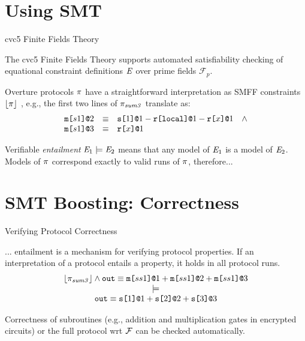 \documentclass{beamer}
\newcommand{\sumthree}{\prog_{\mathit{sum3}}}
\begin{document}
\section{Using SMT}

\begin{frame}{cvc5 Finite Fields Theory}

  The cvc5 Finite Fields Theory supports automated satisfiability checking of equational
  constraint definitions $\mathit{E}$ over prime fields $\mathcal{F}_{p}$.

  \medskip
  
  Overture protocols $\pi$ have a straightforward interpretation as SMFF constraints $\lfloor \pi \rfloor$ , e.g.,
  the first two lines of $\pi_{\mathit{sum3}}$ translate as:
  $$
    \begin{array}{lll}
      \texttt{m[}s1\texttt{]}\texttt{@}2 &\equiv& \texttt{s[}1\texttt{]}\texttt{@}1 - \texttt{r[}\mathtt{local}\texttt{]}\texttt{@}1 - \texttt{r[}x\texttt{]}\texttt{@}1\quad \wedge \\ 
      \texttt{m[}s1\texttt{]}\texttt{@}3 &\equiv& \texttt{r[}x\texttt{]}\texttt{@}1 
    \end{array}
 $$

 Verifiable \emph{entailment} $\mathit{E}_1 \models \mathit{E}_2$ means that any model of $\mathit{E}_1$ is a model
 of $\mathit{E}_2$. Models of $\pi$ correspond exactly to valid runs of $\pi$, therefore...
  
\end{frame}

\section{SMT Boosting: Correctness}

\begin{frame}{Verifying Protocol Correctness}

  ... entailment is a mechanism for verifying protocol properties. If an interpretation
  of a protocol entails a property, it holds in all protocol runs. 
$$
\begin{array}{c}
  \toeq{\sumthree} \wedge \ttt{out} \eop \mx{ss1}{1} + \mx{ss1}{2} + \mx{ss1}{3}\\ \models\\
  \ttt{out} \eop \sx{1}{1} \fplus \sx{2}{2} \fplus \sx{3}{3}
\end{array}
$$

Correctness of subroutines (e.g., addition and multiplication gates in encrypted circuits)
or the full protocol wrt $\mathcal{F}$ can be checked automatically.
\end{frame}
\end{document}
